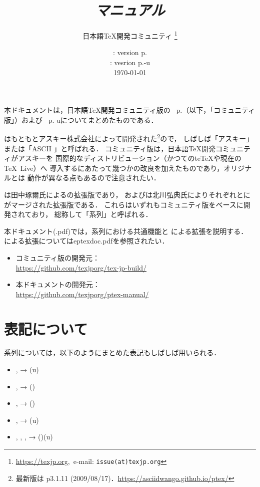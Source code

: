 \documentclass[a4paper,11pt,nomag,dvipdfmx]{jsarticle}
\def\Pver{p\the\ptexversion.\the\ptexminorversion\ptexrevision}
\def\UPver{\Pver-u\the\uptexversion\uptexrevision}
\begin{document}
\title{\emph{\pTeX マニュアル}}
\author{日本語\TeX 開発コミュニティ\null
\thanks{\url{https://texjp.org},\ e-mail: \texttt{issue(at)texjp.org}}}
\date{\pTeX: version \Pver \\ \upTeX: vesrion \UPver \\[1ex] \today}
\maketitle

本ドキュメントは，日本語\TeX 開発コミュニティ版の
\pTeX~\Pver（以下，「コミュニティ版\pTeX 」）および
\upTeX~\UPver についてまとめたものである．

\pTeX はもともとアスキー株式会社によって開発された\footnote{最新版は
p3.1.11 (2009/08/17)．\url{https://asciidwango.github.io/ptex/}}ので，
しばしば「アスキー\pTeX 」または「ASCII \pTeX 」と呼ばれる．
コミュニティ版\pTeX は，日本語\TeX 開発コミュニティがアスキー\pTeX を
国際的なディストリビューション（かつてのte\TeX や現在の\TeX~Live）へ
導入するにあたって幾つかの改良を加えたものであり，オリジナルとは
動作が異なる点もあるので注意されたい．

\upTeX は田中琢爾氏による\pTeX の拡張版であり，
\epTeX および\eupTeX は北川弘典氏によりそれぞれ\pTeX と\upTeX に
\eTeX がマージされた拡張版である．
これらはいずれもコミュニティ版\pTeX をベースに開発されており，
総称して「\pTeX 系列」と呼ばれる．

本ドキュメント(\jobname.pdf)では，\pTeX 系列における共通機能と
\upTeX による拡張を説明する．%
\epTeX による拡張についてはeptexdoc.pdfを参照されたい．

\begin{itemize}
  \item コミュニティ版\pTeX の開発元：\\
    \url{https://github.com/texjporg/tex-jp-build/}
  \item 本ドキュメントの開発元：\\
    \url{https://github.com/texjporg/ptex-manual/}
\end{itemize}

\newpage
\tableofcontents

\newpage

\section*{表記について}
\pTeX 系列については，以下のようにまとめた表記もしばしば用いられる．
\begin{itemize}
  \item \pTeX, \upTeX → (u)\pTeX
  \item \pTeX, \epTeX → (\eTeXpre)\pTeX
  \item \upTeX, \eupTeX → (\eTeXpre)\upTeX
  \item \epTeX, \eupTeX → \eTeXpre(u)\pTeX
  \item \pTeX, \upTeX, \epTeX, \eupTeX → (\eTeXpre)(u)\pTeX
\end{itemize}
\end{document}
